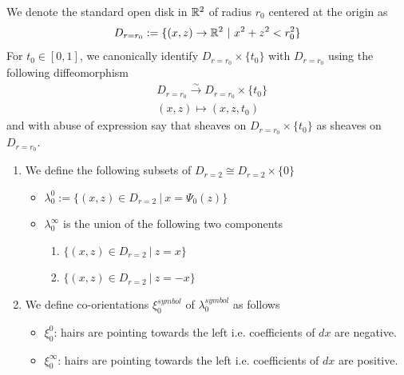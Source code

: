 \begin{definition}
We denote the standard open disk in $\mathbb{R}^2$ of radius $r_0$ centered at the origin as 
\[
D_{r=r_0} := \{(x,z)\rightarrow \mathbb{R}^2 ~|~ x^2+z^2 < r_0^2\}
\]
For $t_0 \in [0,1]$, we canonically identify $D_{r=r_0}\times \{t_0\}$ with $D_{r=r_0}$ using the following diffeomorphism
\begin{align*}
& D_{r=r_0} \xrightarrow{\sim} D_{r=r_0} \times \{t_0\} \\
& (x,z) \mapsto (x,z,t_0)
\end{align*}
and with abuse of expression say that sheaves on $D_{r=r_0}\times \{t_0\}$ as sheaves on $D_{r=r_0}$.
\end{definition}

\begin{definition}
\begin{enumerate}
\item We define the following subsets of $D_{r=2} \cong D_{r=2}\times \{0\}$
\begin{itemize}
\item $\lambda_0^0 := \{(x,z) \in D_{r=2} ~|~ x = \Psi_0(z)\}$

\item $\lambda_0^\infty$ is the union of the following two components
\begin{enumerate}[label=(\roman*)]
\item $\{(x,z) \in D_{r=2} ~|~ z = x \}$

\item $\{(x,z) \in D_{r=2} ~|~ z = -x \}$
\end{enumerate}
\end{itemize}

\item We define co-orientations $\xi_0^{symbol}$ of $\lambda_0^{symbol}$ as follows
\begin{itemize}
\item $\xi_0^0$: hairs are pointing towards the left i.e. coefficients of $dx$ are negative.

\item $\xi_0^\infty$: hairs are pointing towards the left i.e. coefficients of $dx$ are positive.
\end{itemize}
\end{enumerate}
\end{definition}

